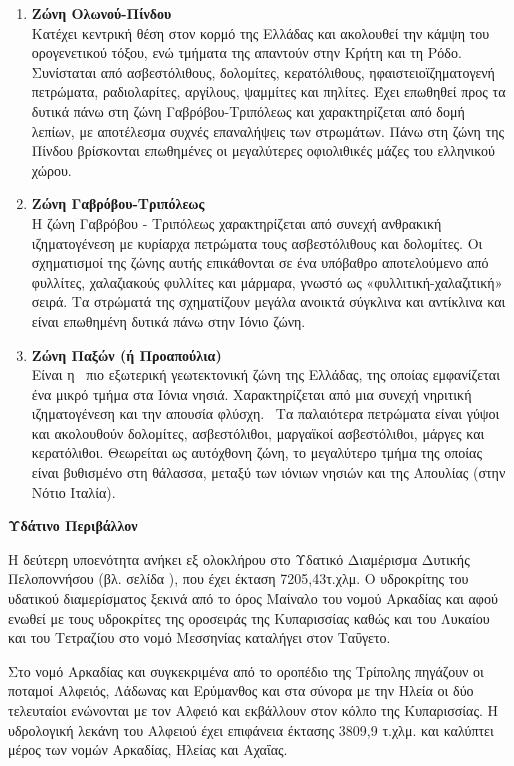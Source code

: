 \documentclass[12pt]{article}
\begin{document}
	\begin{enumerate}
		\item \textbf{Ζώνη Ολωνού-Πίνδου} \\
		Κατέχει κεντρική θέση στον κορμό της Ελλάδας και ακολουθεί την κάμψη του ορογενετικού τόξου, ενώ τμήματα της απαντούν στην Κρήτη και τη Ρόδο. Συνίσταται από ασβεστόλιθους, δολομίτες, κερατόλιθους, ηφαιστειοϊζηματογενή πετρώματα, ραδιολαρίτες, αργίλους, ψαμμίτες και πηλίτες. Έχει επωθηθεί προς τα δυτικά πάνω στη ζώνη Γαβρόβου-Τριπόλεως και χαρακτηρίζεται από δομή λεπίων, με αποτέλεσμα συχνές επαναλήψεις των στρωμάτων. Πάνω στη ζώνη της Πίνδου βρίσκονται επωθημένες οι μεγαλύτερες οφιολιθικές μάζες του ελληνικού χώρου.
		\item \textbf{Ζώνη Γαβρόβου-Τριπόλεως} \\
		Η ζώνη Γαβρόβου - Τριπόλεως χαρακτηρίζεται από συνεχή ανθρακική ιζηματογένεση με κυρίαρχα πετρώματα τους ασβεστόλιθους και δολομίτες. Οι σχηματισμοί της ζώνης αυτής επικάθονται σε ένα υπόβαθρο αποτελούμενο από φυλλίτες, χαλαζιακούς φυλλίτες και μάρμαρα, γνωστό ως «φυλλιτική-χαλαζιτική» σειρά. Τα στρώματά της σχηματίζουν μεγάλα ανοικτά σύγκλινα και αντίκλινα και είναι επωθημένη δυτικά πάνω στην Ιόνιο ζώνη.
		\item \textbf{Ζώνη Παξών (ή Προαπούλια)} \\
		Είναι η  πιο εξωτερική γεωτεκτονική ζώνη της Ελλάδας, της οποίας εμφανίζεται  ένα μικρό τμήμα στα Ιόνια νησιά. Χαρακτηρίζεται από μια συνεχή νηριτική ιζηματογένεση και την απουσία φλύσχη.  Τα παλαιότερα πετρώματα είναι γύψοι και ακολουθούν δολομίτες, ασβεστόλιθοι, μαργαϊκοί ασβεστόλιθοι, μάργες και κερατόλιθοι. Θεωρείται ως αυτόχθονη ζώνη, το μεγαλύτερο τμήμα της οποίας είναι βυθισμένο στη θάλασσα, μεταξύ των ιόνιων νησιών και της Απουλίας (στην Νότιο Ιταλία).
	\end{enumerate}

	\textbf{Υδάτινο Περιβάλλον}
	
	Η δεύτερη υποενότητα ανήκει εξ ολοκλήρου στο Υδατικό Διαμέρισμα Δυτικής Πελοποννήσου (βλ. σελίδα \pageref{ydatika}), που έχει έκταση 7205,43τ.χλμ. Ο υδροκρίτης του υδατικού διαμερίσματος ξεκινά από το όρος Μαίναλο του νομού Αρκαδίας και αφού ενωθεί με τους υδροκρίτες της οροσειράς της Κυπαρισσίας καθώς και του Λυκαίου και του Τετραζίου στο νομό Μεσσηνίας καταλήγει στον Ταΰγετο.
	
	Στο νομό Αρκαδίας και συγκεκριμένα από το οροπέδιο της Τρίπολης πηγάζουν οι ποταμοί Αλφειός, Λάδωνας και Ερύμανθος και στα σύνορα με την Ηλεία οι δύο τελευταίοι ενώνονται με τον Αλφειό και εκβάλλουν στον κόλπο της Κυπαρισσίας. Η υδρολογική λεκάνη του Αλφειού έχει επιφάνεια έκτασης 3809,9 τ.χλμ. και καλύπτει μέρος των νομών Αρκαδίας, Ηλείας και Αχαΐας.
	
\end{document}
